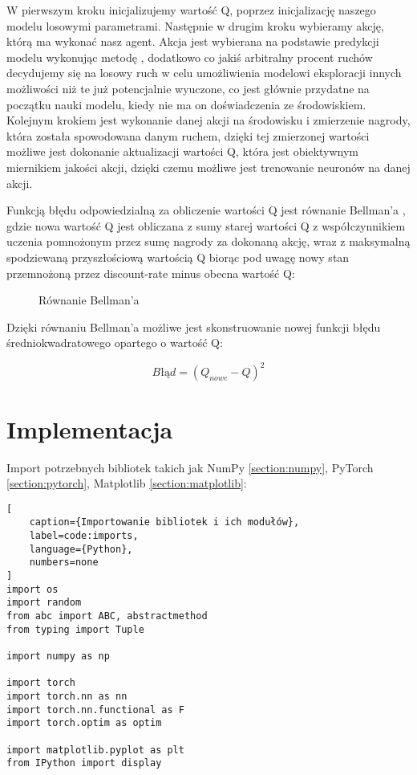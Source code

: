 W pierwszym kroku inicjalizujemy wartość Q, poprzez inicjalizację naszego modelu losowymi parametrami. Następnie w drugim kroku wybieramy akcję, którą ma wykonać nasz agent. Akcja jest wybierana na podstawie predykcji modelu wykonując metodę , dodatkowo co jakiś arbitralny procent ruchów decydujemy się na losowy ruch w celu umożliwienia modelowi eksploracji innych możliwości niż te już potencjalnie wyuczone, co jest głównie przydatne na początku nauki modelu, kiedy nie ma on doświadczenia ze środowiskiem. Kolejnym krokiem jest wykonanie danej akcji na środowisku i zmierzenie nagrody, która została spowodowana danym ruchem, dzięki tej zmierzonej wartości możliwe jest dokonanie aktualizacji wartości Q, która jest obiektywnym miernikiem jakości akcji, dzięki czemu możliwe jest trenowanie neuronów na danej akcji.

Funkcją błędu odpowiedzialną za obliczenie wartości Q jest równanie Bellman'a \cite{BellmanEquation}, gdzie nowa wartość Q jest obliczana z sumy starej wartości Q z współczynnikiem uczenia pomnożonym przez sumę nagrody za dokonaną akcję, wraz z maksymalną spodziewaną przyszłościową wartością Q biorąc pod uwagę nowy stan przemnożoną przez discount-rate minus obecna wartość Q:


\begin{figure}[h]
    \centering
    \caption{Równanie Bellman'a \cite{BellmanEquationPic}}
    \label{img:bellman_eq}
\end{figure}

Dzięki równaniu Bellman'a możliwe jest skonstruowanie nowej funkcji błędu średniokwadratowego \cite{BladSredniokwadratowy} opartego o wartość Q:

$$
    Błąd = (Q_{nowe} - Q)^{2}
$$

\clearpage

\section{Implementacja}

Import potrzebnych bibliotek takich jak NumPy \ref{section:numpy}, PyTorch \ref{section:pytorch}, Matplotlib \ref{section:matplotlib}:

\begin{onepage}
    \begin{lstlisting}[
    caption={Importowanie bibliotek i ich modułów},
    label=code:imports,
    language={Python},
    numbers=none
]
import os
import random
from abc import ABC, abstractmethod
from typing import Tuple

import numpy as np

import torch
import torch.nn as nn
import torch.nn.functional as F
import torch.optim as optim

import matplotlib.pyplot as plt
from IPython import display
    \end{lstlisting}
\end{onepage}

